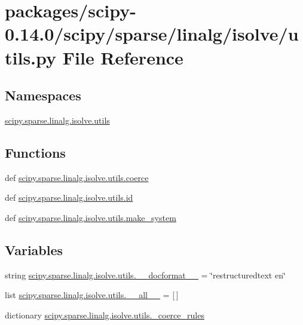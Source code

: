 \hypertarget{scipy-0_814_80_2scipy_2sparse_2linalg_2isolve_2utils_8py}{}\section{packages/scipy-\/0.14.0/scipy/sparse/linalg/isolve/utils.py File Reference}
\label{scipy-0_814_80_2scipy_2sparse_2linalg_2isolve_2utils_8py}
\subsection*{Namespaces}
\begin{DoxyCompactItemize}
\item 
 \hyperlink{namespacescipy_1_1sparse_1_1linalg_1_1isolve_1_1utils}{scipy.\+sparse.\+linalg.\+isolve.\+utils}
\end{DoxyCompactItemize}
\subsection*{Functions}
\begin{DoxyCompactItemize}
\item 
def \hyperlink{namespacescipy_1_1sparse_1_1linalg_1_1isolve_1_1utils_a54757949523b337fcd6a6f884b6606f6}{scipy.\+sparse.\+linalg.\+isolve.\+utils.\+coerce}
\item 
def \hyperlink{namespacescipy_1_1sparse_1_1linalg_1_1isolve_1_1utils_af5631c8c6e1205d4ac7efe128867d6b3}{scipy.\+sparse.\+linalg.\+isolve.\+utils.\+id}
\item 
def \hyperlink{namespacescipy_1_1sparse_1_1linalg_1_1isolve_1_1utils_a1ac40c9540e974d3dbc3e32affb248ec}{scipy.\+sparse.\+linalg.\+isolve.\+utils.\+make\+\_\+system}
\end{DoxyCompactItemize}
\subsection*{Variables}
\begin{DoxyCompactItemize}
\item 
string \hyperlink{namespacescipy_1_1sparse_1_1linalg_1_1isolve_1_1utils_a04412a92342b43fefb2c78efe66c37ec}{scipy.\+sparse.\+linalg.\+isolve.\+utils.\+\_\+\+\_\+docformat\+\_\+\+\_\+} = \char`\"{}restructuredtext en\char`\"{}
\item 
list \hyperlink{namespacescipy_1_1sparse_1_1linalg_1_1isolve_1_1utils_a3d4975cee26d5d65ddef9dc4e15191a4}{scipy.\+sparse.\+linalg.\+isolve.\+utils.\+\_\+\+\_\+all\+\_\+\+\_\+} = \mbox{[}$\,$\mbox{]}
\item 
dictionary \hyperlink{namespacescipy_1_1sparse_1_1linalg_1_1isolve_1_1utils_aaf644d3a49be0e1569a8dd3638df915f}{scipy.\+sparse.\+linalg.\+isolve.\+utils.\+\_\+coerce\+\_\+rules}
\end{DoxyCompactItemize}
